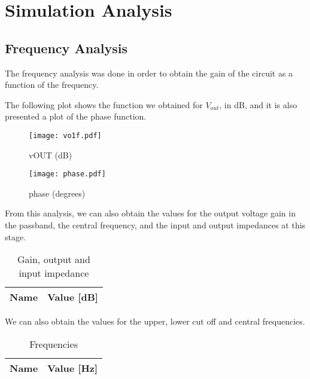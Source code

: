 \section{Simulation Analysis}
\label{sec:simulation}

\subsection{Frequency Analysis}

The frequency analysis was done in order to obtain the gain of the circuit as a function of the frequency. \par
The following plot shows the function we obtained for $V_{out}$, in dB, and it is also presented a plot of the phase function.

\begin{figure}[h] \centering
\texttt{[image: vo1f.pdf]}
\caption{vOUT (dB)}
\label{fig:vOUT}
\end{figure}
\FloatBarrier

\begin{figure}[h] \centering
\texttt{[image: phase.pdf]}
\caption{phase (degrees)}
\label{fig:phase}
\end{figure}
\FloatBarrier

From this analysis, we can also obtain the values for the output voltage gain in the passband, the central frequency, and the input and output impedances at this stage.

\begin{table}[h]
  \centering
  \begin{tabular}{|l|r|}
    \hline    
    {\bf Name} & {\bf Value [dB]} \\ \hline
    
  \end{tabular}
  \caption{Gain, output and input impedance}
  \label{tab:data1sim_sim}
\end{table}
\FloatBarrier

We can also obtain the values for the upper, lower cut off and central frequencies.

 \begin{table}[h]
  \centering
  \begin{tabular}{|l|r|}
    \hline    
    {\bf Name} & {\bf Value [Hz]} \\ \hline
    
  \end{tabular}
  \caption{Frequencies}
  \label{tab:data2sim_sim}
\end{table}
\FloatBarrier

